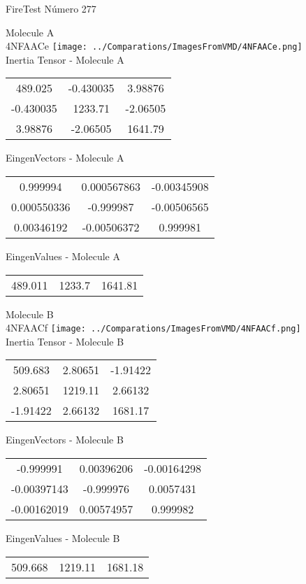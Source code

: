 \vtab[-2cm]
\begin{center}
{\large FireTest \tab Número 277}
\end{center}
\begin{multicols}{2}
\begin{center}

Molecule A \\ 
4NFAACe
\texttt{[image: ../Comparations/ImagesFromVMD/4NFAACe.png]}
\\
Inertia Tensor - Molecule A \\
\vtab

\begin{tabular}{|c c c|}
489.025	 & 	-0.430035	 & 	3.98876	 \\
-0.430035	 & 	1233.71	 & 	-2.06505	 \\
3.98876	 & 	-2.06505	 & 	1641.79
\end{tabular}

\vtab
 EingenVectors - Molecule A     \\
\vtab
\begin{tabular}{|c c c|}
0.999994	 & 	0.000567863	 & 	-0.00345908	 \\
0.000550336	 & 	-0.999987	 & 	-0.00506565	 \\
0.00346192	 & 	-0.00506372	 & 	0.999981
\end{tabular}

\vtab
 EingenValues - Molecule A     \\
\vtab
\begin{tabular}{|c c c|}
489.011	 & 	1233.7	 & 	1641.81	 \\
\end{tabular}
\columnbreak

Molecule B \\ 
4NFAACf
\texttt{[image: ../Comparations/ImagesFromVMD/4NFAACf.png]}
\\
Inertia Tensor - Molecule B \\
\vtab

\begin{tabular}{|c c c|}
509.683	 & 	2.80651	 & 	-1.91422	 \\
2.80651	 & 	1219.11	 & 	2.66132	 \\
-1.91422	 & 	2.66132	 & 	1681.17
\end{tabular}

\vtab
 EingenVectors - Molecule B     \\
\vtab
\begin{tabular}{|c c c|}
-0.999991	 & 	0.00396206	 & 	-0.00164298	 \\
-0.00397143	 & 	-0.999976	 & 	0.0057431	 \\
-0.00162019	 & 	0.00574957	 & 	0.999982
\end{tabular}

\vtab
 EingenValues - Molecule B     \\
\vtab
\begin{tabular}{|c c c|}
509.668	 & 	1219.11	 & 	1681.18	 \\
\end{tabular}

\end{center}
\end{multicols}
